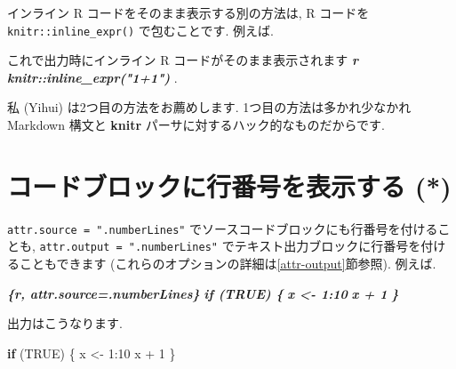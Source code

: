 \documentclass[
  11pt,
  lualatex,ja=standard,jafont=noto]{bxjsreport}
\newenvironment{Shaded}{\begin{snugshade}}{\end{snugshade}}
\newcommand{\ConstantTok}[1]{\textcolor[rgb]{0.00,0.00,0.00}{#1}}
\newcommand{\ControlFlowTok}[1]{\textcolor[rgb]{0.13,0.29,0.53}{\textbf{#1}}}
\newcommand{\DecValTok}[1]{\textcolor[rgb]{0.00,0.00,0.81}{#1}}
\newcommand{\InformationTok}[1]{\textcolor[rgb]{0.56,0.35,0.01}{\textbf{\textit{#1}}}}
\newcommand{\NormalTok}[1]{#1}
\newcommand{\OtherTok}[1]{\textcolor[rgb]{0.56,0.35,0.01}{#1}}
\newcommand{\SpecialCharTok}[1]{\textcolor[rgb]{0.00,0.00,0.00}{#1}}
\begin{document}
インライン R コードをそのまま表示する別の方法は, R コードを \texttt{knitr::inline\_expr()} で包むことです. 例えば.

\begin{Shaded}
\begin{Highlighting}[]
\NormalTok{これで出力時にインライン R コードがそのまま表示されます}
\InformationTok{\textasciigrave{}\textasciigrave{} \textasciigrave{}r knitr::inline\_expr("1+1")\textasciigrave{} \textasciigrave{}\textasciigrave{}}\NormalTok{.}
\end{Highlighting}
\end{Shaded}

私 (Yihui) は2つ目の方法をお薦めします. 1つ目の方法は多かれ少なかれ Markdown 構文と \textbf{knitr} パーサに対するハック的なものだからです.

\hypertarget{number-lines}{%
\section{コードブロックに行番号を表示する (*)}\label{number-lines}}

\texttt{attr.source = ".numberLines"} でソースコードブロックにも行番号を付けることも, \texttt{attr.output = ".numberLines"} でテキスト出力ブロックに行番号を付けることもできます (これらのオプションの詳細は\ref{attr-output}節参照). 例えば.

\begin{Shaded}
\begin{Highlighting}[]
\InformationTok{\textasciigrave{}\textasciigrave{}\textasciigrave{}\{r, attr.source=\textquotesingle{}.numberLines\textquotesingle{}\}}
\InformationTok{if (TRUE) \{}
\InformationTok{  x \textless{}{-} 1:10}
\InformationTok{  x + 1}
\InformationTok{\}}
\InformationTok{\textasciigrave{}\textasciigrave{}\textasciigrave{}}
\end{Highlighting}
\end{Shaded}

出力はこうなります.

\begin{Shaded}
\begin{Highlighting}[numbers=left,,]
\ControlFlowTok{if}\NormalTok{ (}\ConstantTok{TRUE}\NormalTok{) \{}
\NormalTok{  x }\OtherTok{\textless{}{-}} \DecValTok{1}\SpecialCharTok{:}\DecValTok{10}
\NormalTok{  x }\SpecialCharTok{+} \DecValTok{1}
\NormalTok{\}}
\end{Highlighting}
\end{Shaded}
\end{document}
